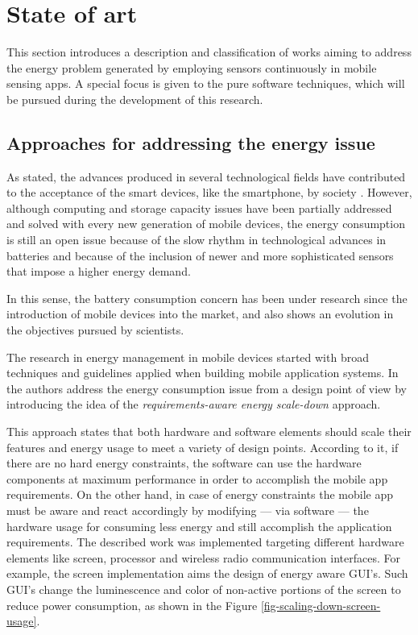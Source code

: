 \section{State of art} 
\label{sec:state_of_art}
This section introduces a description and classification of works aiming to address the energy problem generated by employing sensors continuously in mobile sensing apps.
A special focus is given to the pure software techniques, which will be pursued during the development of this research.

\subsection{Approaches for addressing the energy issue}
\label{sub:approaches_for_addressing_the_energy_issue}

As stated, the advances produced in several technological fields have contributed to the acceptance of the smart devices, like the smartphone, by society \cite{Lane2010,Ra2012}.
However, although computing and storage capacity issues have been partially addressed and solved with every new generation of mobile devices, the energy consumption is still an open issue because of the slow rhythm in technological advances in batteries and because of the inclusion of newer and more sophisticated sensors that impose a higher energy demand.

In this sense, the battery consumption concern has been under research since the introduction of mobile devices into the market, and also shows an evolution in the objectives pursued by scientists. 

The research in energy management in mobile devices started with broad techniques and guidelines applied when building mobile application systems.
In \cite{Mayo2004} the authors address the energy consumption issue from a design point of view by introducing the idea of the \emph{requirements-aware energy scale-down} approach. 

This approach states that both hardware and software elements should scale their features and energy usage to meet a variety of design points.
According to it, if there are no hard energy constraints, the software can use the hardware components at maximum performance in order to accomplish the mobile app requirements.
On the other hand, in case of energy constraints the mobile app must be aware and react accordingly by modifying --- via software --- the hardware usage for consuming less energy and still accomplish the application requirements.
The described work was implemented targeting different hardware elements like screen, processor and wireless radio communication interfaces.
For example, the screen implementation aims the design of energy aware GUI's.
Such GUI's change the luminescence and color of non-active portions of the screen to reduce power consumption, as shown in the Figure \ref{fig-scaling-down-screen-usage}.

